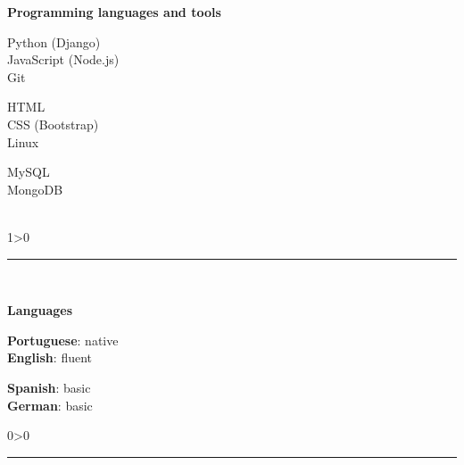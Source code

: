 \documentclass[a4paper,10pt]{article}
\newcommand{\createSection}[4][0]{
    \noindent
	\begin{minipage}{0.16\linewidth}
		\large{\textbf{#2}}
		\vspace{#3\baselineskip}
	\end{minipage}
	\hfill
	\begin{minipage}{0.79\linewidth}
		#4
		\ifnum0#1>0 { \hrule {\ } } \fi
	\end{minipage}
	\vspace{\baselineskip}
}
\begin{document}
    \createSection[1]{Programming languages and tools}{1}{
        \large{\bf
			\begin{minipage}{0.33\linewidth}
				Python (Django)\\
				JavaScript (Node.js)\\
				Git\\
			\end{minipage}
			\begin{minipage}{0.33\linewidth}
				HTML\\
				CSS (Bootstrap)\\
				Linux\\
			\end{minipage}
			\begin{minipage}{0.33\linewidth}
				MySQL\\
				MongoDB\\
				\\
			\end{minipage}
		}
    }
	
	\createSection{Languages}{2}{
	    \large{
			\begin{minipage}{0.5\linewidth}
				\textbf{Portuguese}: native \\
				\textbf{English}: fluent \\
			\end{minipage}
			\begin{minipage}{0.5\linewidth}
				\textbf{Spanish}: basic \\
				\textbf{German}: basic \\
			\end{minipage}
		}
	}
\label{lastPage}
\end{document}
